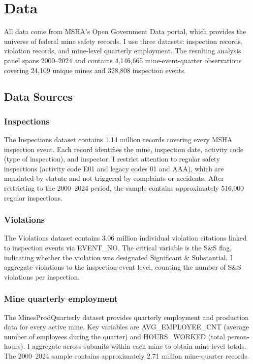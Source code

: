 \documentclass[12pt]{article}
\begin{document}
\section{Data}

All data come from MSHA's Open Government Data portal, which provides the universe of federal mine safety records. I use three datasets: inspection records, violation records, and mine-level quarterly employment. The resulting analysis panel spans 2000--2024 and contains 4,146,665 mine-event-quarter observations covering 24,109 unique mines and 328,808 inspection events.

\subsection{Data Sources}

\subsubsection*{Inspections} The Inspections dataset contains 1.14 million records covering every MSHA inspection event. Each record identifies the mine, inspection date, activity code (type of inspection), and inspector. I restrict attention to regular safety inspections (activity code E01 and legacy codes 01 and AAA), which are mandated by statute and not triggered by complaints or accidents. After restricting to the 2000--2024 period, the sample contains approximately 516,000 regular inspections.

\subsubsection*{Violations} The Violations dataset contains 3.06 million individual violation citations linked to inspection events via EVENT\_NO. The critical variable is the S\&S flag, indicating whether the violation was designated Significant \& Substantial. I aggregate violations to the inspection-event level, counting the number of S\&S violations per inspection.

\subsubsection*{Mine quarterly employment} The MinesProdQuarterly dataset provides quarterly employment and production data for every active mine. Key variables are AVG\_EMPLOYEE\_CNT (average number of employees during the quarter) and HOURS\_WORKED (total person-hours). I aggregate across subunits within each mine to obtain mine-level totals. The 2000--2024 sample contains approximately 2.71 million mine-quarter records.
\end{document}
